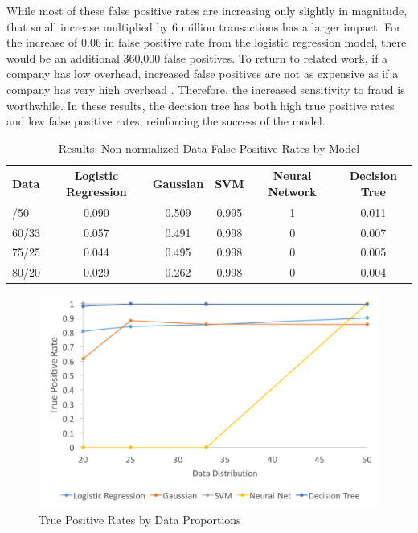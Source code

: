 \documentclass[midd]{thesis}
\begin{document}
While most of these false positive rates are increasing only slightly in magnitude, that small increase multiplied by 6 million transactions has a larger impact. For the increase of 0.06 in false positive rate from the logistic regression model, there would be an additional 360,000 false positives. To return to related work, if a company has low overhead, increased false positives are not as expensive as if a company has very high overhead \cite{Chan}. Therefore, the increased sensitivity to fraud is worthwhile. In these results, the decision tree has both high true positive rates and low false positive rates, reinforcing the success of the model.   


\begin{table}[htbp]\centering
\def\sym#1{\ifmmode^{#1}\else\(^{#1}\)\fi}
\caption{Results: Non-normalized Data False Positive Rates by Model  \label{tab1}}
\label{tab:fpr}
\scalebox{1} {
\begin{tabular}{l@{\hskip 0.1in} c c c c c} \addlinespace\hline\hline
\addlinespace
Data&Logistic Regression& Gaussian&SVM& Neural Network &Decision Tree\\
\hline

\addlinespace
\addlinespace
50/50	& 0.090 &	0.509	&0.995 &1&	0.011\\
60/33	& 0.057	& 0.491	& 0.998	& 0	& 0.007\\
75/25	& 0.044	& 0.495	& 0.998	& 0	& 0.005\\
80/20	& 0.029	& 0.262	& 0.998	& 0	& 0.004\\


\hline\hline
\end{tabular}
}
\end{table} 


\begin{figure} \centering
  \includegraphics[scale=.6]{tpr.png}
  \caption{True Positive Rates by Data Proportions}
  \label{fig:tpr}
\end{figure}
\end{document}
